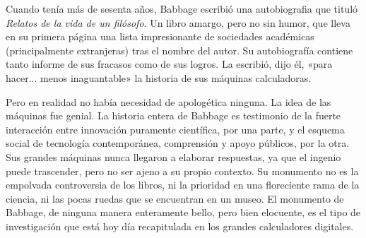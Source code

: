 \documentclass[a4paper, 12pt]{article}
\begin{document}
Cuando tenía más de sesenta años, Babbage escribió una autobiografia que tituló {\it Relatos de la vida de un filósofo}. Un libro amargo, pero no sin humor, que lleva en su primera página una lista impresionante de sociedades académicas (principalmente extranjeras) tras el nombre del autor. Su autobiografía contiene tanto informe de sus fracasos como de sus logros. La escribió, dijo él, «para hacer... menos inaguantable» la historia de sus máquinas calculadoras.

Pero en realidad no había necesidad de apologética ninguna. La idea de las máquinas fue genial. La historia entera de Babbage es testimonio de la fuerte interacción entre innovación puramente científica, por una parte, y el esquema social de tecnología contemporánea, comprensión y apoyo públicos, por la otra. Sus grandes máquinas nunca llegaron a elaborar respuestas, ya que el ingenio puede trascender, pero no ser ajeno a su propio contexto. Su monumento no es la empolvada controversia de los libros, ni la prioridad en una floreciente rama de la ciencia, ni las pocas ruedas que se encuentran en un museo. El monumento de Babbage, de ninguna manera enteramente bello, pero bien elocuente, es el tipo de investigación que está hoy día recapitulada en los grandes calculadores digitales.
\end{document}
